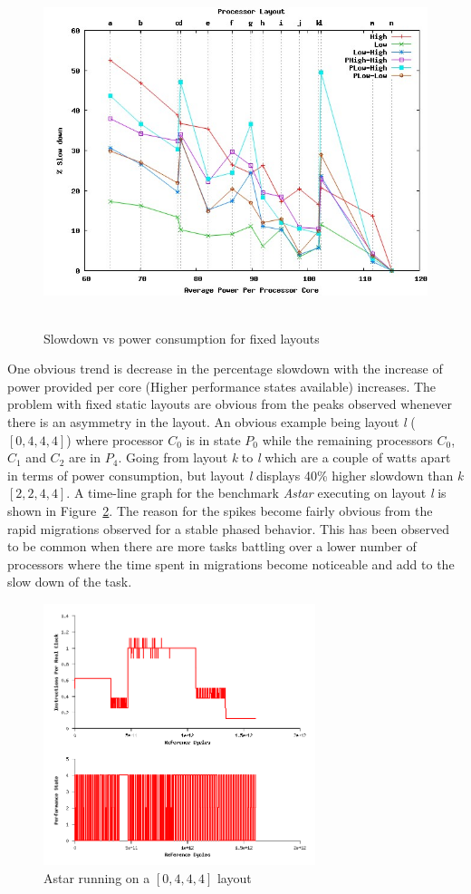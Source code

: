 \begin{figure}[h!]
  \begin{center}
    \includegraphics[height=4in]{figures/fixed_results.jpg}
    \caption{Slowdown vs power consumption for fixed layouts}
    \label{fig:fixed_res}
  \end{center}
\end{figure}

One obvious trend is decrease in the percentage slowdown with the increase of power provided per 
core (Higher performance states available)
increases. The problem with fixed static layouts are obvious from the peaks observed
whenever there is an asymmetry in the layout. An obvious example being layout \textit{l} ($[0,4,4,4]$) where processor
$C_0$ is in state $P_0$ while the remaining processors $C_0$,$C_1$ and $C_2$ are in
$P_4$. Going from layout \textit{k} to \textit{l} which are a couple of watts apart in terms of power consumption,
but layout \textit{l} displays 40\% higher slowdown than \textit{k} $[2,2,4,4]$. 
A time-line graph for the benchmark \textit{Astar} executing on layout \textit{l} is shown in Figure~\ref{fig:fight_to_death}.
The reason for the spikes become fairly obvious from the rapid migrations observed for
a stable phased behavior. This has been observed to be common when there are more tasks battling
over a lower number of processors where the time spent in migrations
become noticeable and add to the slow down of the task. 

\begin{figure}[h!]
  \begin{center}
    \includegraphics[height=3in]{figures/astar_fight.png}
    \caption{Astar running on a $[0,4,4,4]$ layout}
    \label{fig:fight_to_death}
  \end{center}
\end{figure}
